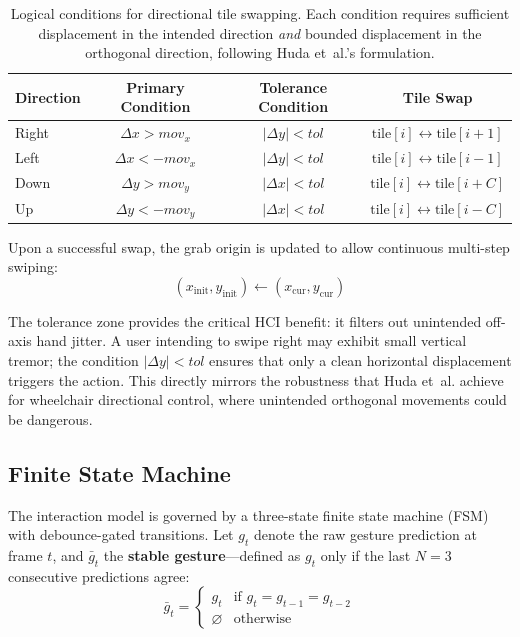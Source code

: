 \documentclass[11pt,a4paper]{article}
\begin{document}
\begin{table}[htbp]
\centering
\caption{Logical conditions for directional tile swapping. Each condition requires sufficient displacement in the intended direction \textit{and} bounded displacement in the orthogonal direction, following Huda et~al.'s formulation.}
\label{tab:swipe_conditions}
\begin{tabular}{@{}lccc@{}}
\toprule
\textbf{Direction} & \textbf{Primary Condition} & \textbf{Tolerance Condition} & \textbf{Tile Swap} \\
\midrule
Right   & $\Delta x > mov_x$   & $|\Delta y| < tol$ & $\text{tile}[i] \leftrightarrow \text{tile}[i+1]$ \\
Left    & $\Delta x < -mov_x$  & $|\Delta y| < tol$ & $\text{tile}[i] \leftrightarrow \text{tile}[i-1]$ \\
Down    & $\Delta y > mov_y$   & $|\Delta x| < tol$ & $\text{tile}[i] \leftrightarrow \text{tile}[i+C]$ \\
Up      & $\Delta y < -mov_y$  & $|\Delta x| < tol$ & $\text{tile}[i] \leftrightarrow \text{tile}[i-C]$ \\
\bottomrule
\end{tabular}
\end{table}

Upon a successful swap, the grab origin is updated to allow continuous multi-step swiping:
\begin{equation}
    (x_{\text{init}}, y_{\text{init}}) \leftarrow (x_{\text{cur}}, y_{\text{cur}})
    \label{eq:origin_update}
\end{equation}

The tolerance zone provides the critical HCI benefit: it filters out unintended off-axis hand jitter. A user intending to swipe right may exhibit small vertical tremor; the condition $|\Delta y| < tol$ ensures that only a clean horizontal displacement triggers the action. This directly mirrors the robustness that Huda et~al. achieve for wheelchair directional control, where unintended orthogonal movements could be dangerous.

\subsection{Finite State Machine}
\label{sec:fsm}

The interaction model is governed by a three-state finite state machine (FSM) with debounce-gated transitions. Let $g_t$ denote the raw gesture prediction at frame $t$, and $\bar{g}_t$ the \textbf{stable gesture}---defined as $g_t$ only if the last $N = 3$ consecutive predictions agree:
\begin{equation}
    \bar{g}_t =
    \begin{cases}
        g_t & \text{if } g_{t} = g_{t-1} = g_{t-2} \\
        \varnothing & \text{otherwise}
    \end{cases}
    \label{eq:debounce}
\end{equation}
\end{document}

